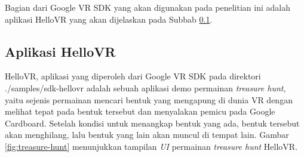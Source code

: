  
Bagian dari Google VR SDK yang akan digunakan pada penelitian ini adalah aplikasi HelloVR yang akan dijelaskan pada Subbab \ref{subs:hello-vr}. 

\subsection{Aplikasi HelloVR}
\label{subs:hello-vr}
HelloVR, aplikasi yang diperoleh dari Google VR SDK pada direktori ./samples/sdk-hellovr adalah sebuah aplikasi demo permainan \textit{treasure hunt}, yaitu sejenis permainan mencari bentuk yang mengapung di dunia VR dengan melihat tepat pada bentuk tersebut dan menyalakan pemicu pada Google Cardboard. Setelah kondisi untuk menangkap bentuk yang ada, bentuk tersebut akan menghilang, lalu bentuk yang lain akan muncul di tempat lain. Gambar \ref{fig:treasure-hunt} menunjukkan tampilan \textit{UI} permainan \textit{treasure hunt} HelloVR. 

